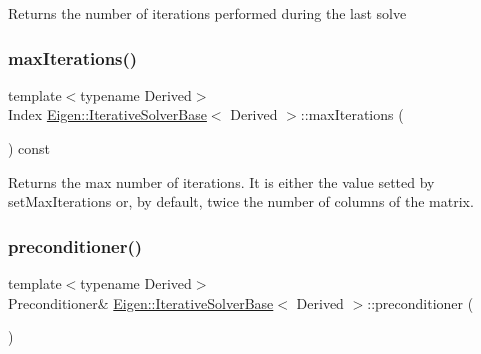 \begin{DoxyReturn}{Returns}
the number of iterations performed during the last solve 
\end{DoxyReturn}
\mbox{\label{class_eigen_1_1_iterative_solver_base_a168a74c8dceb6233b220031fdd756ba0}} 
\subsubsection{\texorpdfstring{maxIterations()}{maxIterations()}}
{\footnotesize\ttfamily template$<$typename Derived$>$ \\
Index \mbox{\hyperlink{class_eigen_1_1_iterative_solver_base}{Eigen\+::\+Iterative\+Solver\+Base}}$<$ Derived $>$\+::max\+Iterations (\begin{DoxyParamCaption}{ }\end{DoxyParamCaption}) const\hspace{0.3cm}{\ttfamily [inline]}}

\begin{DoxyReturn}{Returns}
the max number of iterations. It is either the value setted by set\+Max\+Iterations or, by default, twice the number of columns of the matrix. 
\end{DoxyReturn}
\mbox{\label{class_eigen_1_1_iterative_solver_base_a5e88f2a323a2900205cf807af94f8051}} 
\subsubsection{\texorpdfstring{preconditioner()}{preconditioner()}\hspace{0.1cm}{\footnotesize\ttfamily [1/2]}}
{\footnotesize\ttfamily template$<$typename Derived$>$ \\
Preconditioner\& \mbox{\hyperlink{class_eigen_1_1_iterative_solver_base}{Eigen\+::\+Iterative\+Solver\+Base}}$<$ Derived $>$\+::preconditioner (\begin{DoxyParamCaption}{ }\end{DoxyParamCaption})\hspace{0.3cm}{\ttfamily [inline]}}

